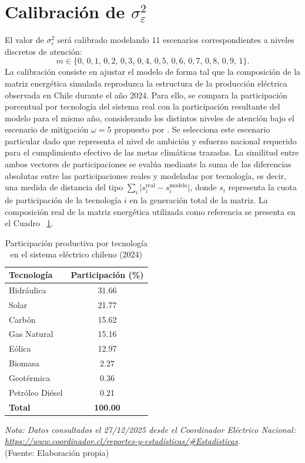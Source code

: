 \section{\boldmath Calibración de $\sigma_{\varepsilon}^2$}
El valor de $\sigma_\epsilon^2$ será calibrado modelando 11 escenarios correspondientes a niveles discretos de atención:
\[
m \in \{0,\,0{,}1,\,0{,}2,\,0{,}3,\,0{,}4,\,0{,}5,\,0{,}6,\,0{,}7,\,0{,}8,\,0{,}9,\,1\}.
\]
La calibración consiste en ajustar el modelo de forma tal que la composición de la matriz energética simulada reproduzca la estructura de la producción eléctrica observada en Chile durante el año 2024. Para ello, se compara la participación porcentual por tecnología del sistema real con la participación resultante del modelo para el mismo año, considerando los distintos niveles de atención bajo el escenario de mitigación $\omega =5$ propuesto por . Se selecciona este escenario particular dado que representa el nivel de ambición y esfuerzo nacional requerido para el cumplimiento efectivo de las metas climáticas trazadas. La similitud entre ambos vectores de participaciones se evalúa mediante la suma de las diferencias absolutas entre las participaciones reales y modeladas por tecnología, es decir, una medida de distancia del tipo \( \sum_i \lvert s_i^{\text{real}} - s_i^{\text{modelo}} \rvert \), donde $s_i$ representa la cuota de participación de la tecnología $i$ en la generación total de la matriz. La composición real de la matriz energética utilizada como referencia se presenta en el Cuadro ~\ref{tab:participacion_real_2024}.


\begin{table}[H]
\centering
\caption{Participación productiva por tecnología en el sistema eléctrico chileno (2024)}
\label{tab:participacion_real_2024}
\renewcommand{\arraystretch}{1.15}
\setlength{\tabcolsep}{10pt}
\begin{tabular}{l c}
\toprule
\textbf{Tecnología} & \textbf{Participación (\%)} \\
\midrule
Hidráulica        & 31.66 \\
Solar             & 21.77 \\
Carbón            & 15.62 \\
Gas Natural       & 15.16 \\
Eólica            & 12.97 \\
Biomasa           & 2.27  \\
Geotérmica        & 0.36  \\
Petróleo Diésel   & 0.21  \\
\midrule
\textbf{Total}    & \textbf{100.00} \\
\bottomrule
\end{tabular}

\vspace{0.2cm}
\footnotesize\textit{Nota: Datos consultados el 27/12/2025 desde el Coordinador Eléctrico Nacional: \url{https://www.coordinador.cl/reportes-y-estadisticas/\#Estadisticas}.}\\
(Fuente: Elaboración propia)
\end{table}

